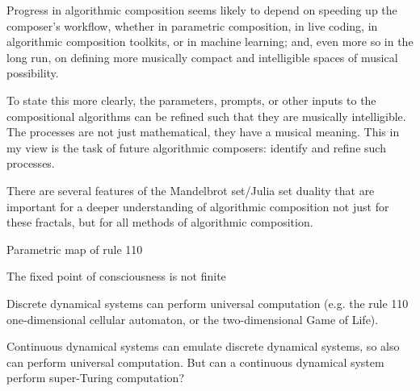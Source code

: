 \documentclass[11pt]{scrartcl}
\begin{document}
Progress in algorithmic composition seems likely to depend on speeding up the composer's workflow, whether in parametric composition, in live coding, in algorithmic composition toolkits, or in machine learning; and, even more so in the long run, on defining more musically compact and intelligible spaces of musical possibility.

To state this more clearly, the parameters, prompts, or other inputs to the compositional algorithms can be refined such that they are musically intelligible. The processes are not just mathematical, they have a musical meaning. This in my view is the task of future algorithmic composers: identify and refine such processes. 

There are several features of the Mandelbrot set/Julia set duality that are important for a deeper understanding of algorithmic composition not just for these fractals, but for all methods of algorithmic composition. 


%

Parametric map of rule 110

The fixed point of consciousness is not finite

Discrete dynamical systems can perform universal computation (e.g. the rule 110 one-dimensional cellular automaton, or the two-dimensional Game of Life).

Continuous dynamical systems can emulate discrete dynamical systems, so also can perform universal computation. But can a continuous dynamical system perform super-Turing computation? 

\printbibliography
\end{document}
